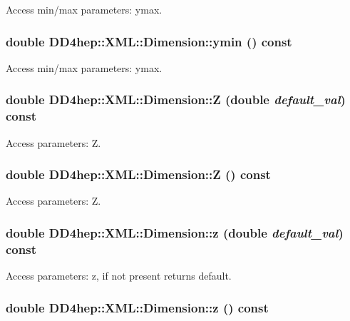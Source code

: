 Access min/max parameters: ymax. \hypertarget{struct_d_d4hep_1_1_x_m_l_1_1_dimension_a6fb066a6e4f74be4a817a7698104e8aa}{
\subsubsection[{ymin}]{\setlength{\rightskip}{0pt plus 5cm}double DD4hep::XML::Dimension::ymin () const}}
\label{struct_d_d4hep_1_1_x_m_l_1_1_dimension_a6fb066a6e4f74be4a817a7698104e8aa}


Access min/max parameters: ymax. \hypertarget{struct_d_d4hep_1_1_x_m_l_1_1_dimension_a577fa767793aa6ae4bba2cde1deaec41}{
\subsubsection[{Z}]{\setlength{\rightskip}{0pt plus 5cm}double DD4hep::XML::Dimension::Z (double {\em default\_\-val}) const}}
\label{struct_d_d4hep_1_1_x_m_l_1_1_dimension_a577fa767793aa6ae4bba2cde1deaec41}


Access parameters: Z. \hypertarget{struct_d_d4hep_1_1_x_m_l_1_1_dimension_a0ee088d7d7df2b8be91f5b453cc23224}{
\subsubsection[{Z}]{\setlength{\rightskip}{0pt plus 5cm}double DD4hep::XML::Dimension::Z () const}}
\label{struct_d_d4hep_1_1_x_m_l_1_1_dimension_a0ee088d7d7df2b8be91f5b453cc23224}


Access parameters: Z. \hypertarget{struct_d_d4hep_1_1_x_m_l_1_1_dimension_aad40ddf84c2b42cf7ba0cbfa88900926}{
\subsubsection[{z}]{\setlength{\rightskip}{0pt plus 5cm}double DD4hep::XML::Dimension::z (double {\em default\_\-val}) const}}
\label{struct_d_d4hep_1_1_x_m_l_1_1_dimension_aad40ddf84c2b42cf7ba0cbfa88900926}


Access parameters: z, if not present returns default. \hypertarget{struct_d_d4hep_1_1_x_m_l_1_1_dimension_a5a82a707d17136f4f6b460dd97d5eea0}{
\subsubsection[{z}]{\setlength{\rightskip}{0pt plus 5cm}double DD4hep::XML::Dimension::z () const}}
\label{struct_d_d4hep_1_1_x_m_l_1_1_dimension_a5a82a707d17136f4f6b460dd97d5eea0}


